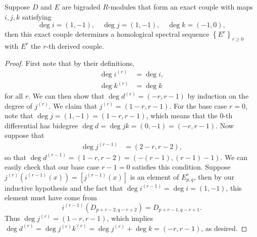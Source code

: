 \documentclass[twoside,10pt]{article}
\begin{document}
\begin{thrm}[]
	\label{thrm:ec2ss}
	Suppose $D$ and $E$ are bigraded $R$-modules that form an exact couple with maps $i,j,k$ satisfying
	\[
	\deg i=(1,-1), \quad \deg j=(1,-1), \quad \deg k=(-1,0),
\] then this exact couple determines a homological spectral sequence $\left\{ E^{r} \right\}_{r \geq 0}$ with $E^{r}$ the $r$-th derived couple.
\end{thrm}
\begin{proof}
	First note that by their definitions,
	\begin{align*}
		\deg i^{(r)}&=\deg i,\\
		\deg k^{(r)}&=\deg k
	\end{align*}
	for all $r$. We can then show that $\deg d^{(r)}=(-r,r-1)$ by induction on the degree of $j^{(r)}$. We claim that $j^{(r)}= (1-r,r-1)$. For the base case $r=0$, note that $\deg j = (1,-1) = (1-r,r-1)$, which means that the 0-th differential has bidegree $\deg d = \deg jk = (0,-1)=(-r,r-1)$. Now suppose that
	\begin{align*}
		\deg j^{(r-1)} &= (2-r,r-2),
	\end{align*}
	so that $\deg d^{(r-1)} = (1-r,r-2) = (-(r-1),(r-1)-1)$. We can easily check that our base case $r-1=0$ satisfies this condition. Suppose $j^{(r)}(i^{(r-1)}(x)) = [j^{(r-1)}(x)]$ is an element of $E_{p,q}^{r}$, then by our inductive hypothesis and the fact that $\deg i^{(r-1)}=\deg i = (1,-1)$, this element must have come from
	\[
		i^{(r-1)}(D_{p+r-2,q-r+2}) = D_{p+r-1,q-r+1}.
	\] Thus $\deg j^{(r)} = (1-r,r-1)$, which implies $\deg d^{(r)} = \deg j^{(r)}k^{(r)} = \deg j^{(r)}+\deg k = (-r,r-1)$, as desired.
\end{proof}
\end{document}
